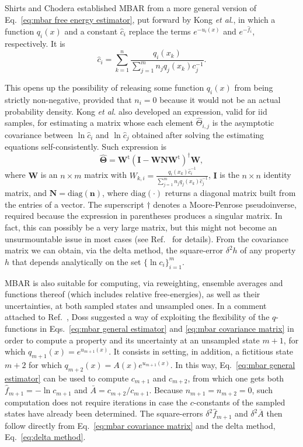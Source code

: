 \documentclass[aip,jcp,reprint,amsmath,amssymb]{revtex4-1}
\newcommand{\mt}[1]{\boldsymbol{\mathbf{#1}}}           %
\newcommand{\vt}[1]{\boldsymbol{\mathbf{#1}}}           %
\newcommand{\tr}[1]{#1^\text{t}}                        %
\begin{document}
Shirts and Chodera\cite{Shirts_2008} established MBAR from a more general version of Eq.~\eqref{eq:mbar free energy estimator}, put forward by Kong \textit{et al}.,\cite{Kong_2003} in which a function $q_i(x)$ and a constant $\hat c_i$ replace the terms $e^{-u_i(x)}$ and $e^{-\hat f_i}$, respectively. It is
\begin{equation}
\label{eq:mbar general estimator}
{\hat c}_i = \sum_{k=1}^n \frac{q_i(x_k)}{\sum_{j=1}^m n_j q_j(x_k) c_j^{-1}}.
\end{equation}
 
This opens up the possibility of releasing some function $q_i(x)$ from being strictly non-negative, provided that $n_i = 0$ because it would not be an actual probability density. Kong \textit{et al}.\cite{Kong_2003} also developed an expression, valid for iid samples, for estimating a matrix whose each element $\hat \Theta_{i,j}$ is the asymptotic covariance between $\ln \hat c_i$ and $\ln \hat c_j$ obtained after solving the estimating equations self-consistently. Such expression is
\begin{equation}
\label{eq:mbar covariance matrix}
\hat{\mt \Theta} = \tr{\mt W} (\mt I - {\mt W}{\mt N}\tr{\mt W})^\dag {\mt W},
\end{equation}
where $\mt W$ is an $n \times m$ matrix with $W_{k,i} = \frac{q_i(x_k) \hat c_i^{-1}}{\sum_{j=1}^m n_j q_j(x_k) \hat c_j^{-1}}$, $\mt I$ is the $n \times n$ identity matrix, and $\mt N = \text{diag}(\vt n)$, where $\text{diag}(\cdot)$ returns a diagonal matrix built from the entries of a vector. The superscript $\dag$ denotes a Moore-Penrose pseudoinverse, required because the expression in parentheses produces a singular matrix. In fact, this can possibly be a very large matrix, but this might not become an unsurmountable issue in most cases (see Ref.~ for details). From the covariance matrix we can obtain, via the delta method, the square-error $\delta^2 h$ of any property $h$ that depends analytically on the set $\{\ln c_i\}_{i=1}^m$.
 
MBAR is also suitable for computing, via reweighting, ensemble averages and functions thereof (which includes relative free-energies), as well as their uncertainties, at both sampled states and unsampled ones. In a comment attached to Ref.~, Doss suggested a way of exploiting the flexibility of the $q$-functions in Eqs.~\eqref{eq:mbar general estimator} and \eqref{eq:mbar covariance matrix} in order to compute a property and its uncertainty at an unsampled state $m+1$, for which $q_{m+1}(x) = e^{u_{m+1}(x)}$. It consists in setting, in addition, a fictitious state $m+2$ for which $q_{m+2}(x) = A(x)e^{u_{m+1}(x)}$. In this way, Eq.~\eqref{eq:mbar general estimator} can be used to compute $c_{m+1}$ and $c_{m+2}$, from which one gets both $\hat f_{m+1} = -\ln c_{m+1}$ and $\bar A = {c_{m+2}}/{c_{m+1}}$. Because $n_{m+1} = n_{m+2} = 0$, such computation does not require iterations in case the $c$-constants of the sampled states have already been determined. The square-errors $\delta^2 \hat f_{m+1}$ and $\delta^2 \overline A$ then follow directly from Eq.~\eqref{eq:mbar covariance matrix} and the delta method, Eq.~\eqref{eq:delta method}.


\end{document}
